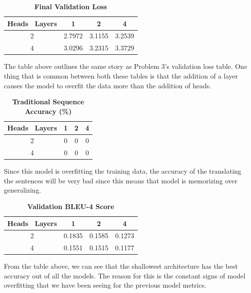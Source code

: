 \documentclass[a4paper]{article}
\begin{document}
\begin{table}[H]
    \centering
    \caption{\textbf{Final Validation Loss}}
    \label{tab:finalVLp4}
    \begin{tabular}{| c || c | c | c |}
        \hline
        Heads \ Layers & 1 & 2 & 4 \\
        \hline
        2 & 2.7972 & 3.1155 & 3.2539 \\
        \hline
        4 & 3.0296 & 3.2315 & 3.3729 \\
        \hline
    \end{tabular}
\end{table}

The table above outlines the same story as Problem 3's validation loss table. One thing that is common between both these tables is that the addition of a layer causes the model to overfit the data more than the addition of heads.

\begin{table}[H]
    \centering
    \caption{\textbf{Traditional Sequence Accuracy (\%)}}
    \label{tab:seqAccp4}
    \begin{tabular}{| c || c | c | c |}
        \hline
        Heads \ Layers & 1 & 2 & 4 \\
        \hline
        2 & 0 & 0 & 0 \\
        \hline
        4 & 0 & 0 & 0 \\
        \hline
    \end{tabular}
\end{table}

Since this model is overfitting the training data, the accuracy of the translating the sentences will be very bad since this means that model is memorizing over generalizing.

\begin{table}[H]
    \centering
    \caption{\textbf{Validation BLEU-4 Score}}
    \label{tab:valBLEUp4}
    \begin{tabular}{| c || c | c | c |}
        \hline
        Heads \ Layers & 1 & 2 & 4 \\
        \hline
        2 & 0.1835 & 0.1585 & 0.1273 \\
        \hline
        4 & 0.1551 & 0.1515 & 0.1177 \\
        \hline
    \end{tabular}
\end{table}

From the table above, we can see that the shallowest architecture has the best accuracy out of all the models. The reason for this is the constant signs of model overfitting that we have been seeing for the previous model metrics.
\end{document}

